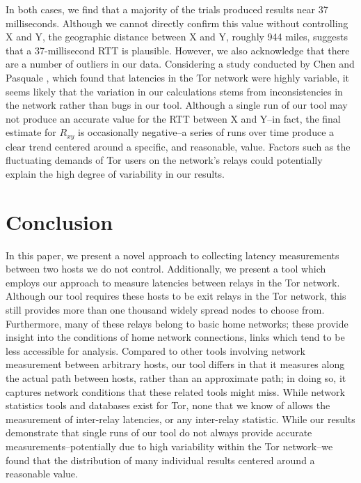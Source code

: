 \documentclass[twocolumn,11pt]{article}
\begin{document}
In both cases, we find that a majority of the trials produced results near 37 milliseconds. Although we cannot directly confirm this value without controlling X and Y, the geographic distance between X and Y, roughly 944 miles, suggests that a 37-millisecond RTT is plausible. However, we also acknowledge that there are a number of outliers in our data. Considering a study conducted by Chen and Pasquale \cite{improving_path}, which found that latencies in the Tor network were highly variable, it seems likely that the variation in our calculations stems from inconsistencies in the network rather than bugs in our tool. Although a single run of our tool may not produce an accurate value for the RTT between X and Y--in fact, the final estimate for $R_{xy}$ is occasionally negative--a series of runs over time produce a clear trend centered around a specific, and reasonable, value. Factors such as the fluctuating demands of Tor users on the network's relays could potentially explain the high degree of variability in our results.

\section{Conclusion}

In this paper, we present a novel approach to collecting latency measurements between two hosts we do not control. Additionally, we present a tool which employs our approach to measure latencies between relays in the Tor network. Although our tool requires these hosts to be exit relays in the Tor network, this still provides more than one thousand widely spread nodes to choose from. Furthermore, many of these relays belong to basic home networks; these provide insight into the conditions of home network connections, links which tend to be less accessible for analysis. Compared to other tools involving network measurement between arbitrary hosts, our tool differs in that it measures along the actual path between hosts, rather than an approximate path; in doing so, it captures network conditions that these related tools might miss. While network statistics tools and databases exist for Tor, none that we know of allows the measurement of inter-relay latencies, or any inter-relay statistic. While our results demonstrate that single runs of our tool do not always provide accurate measurements--potentially due to high variability within the Tor network--we found that the distribution of many individual results centered around a reasonable value.
\end{document}
